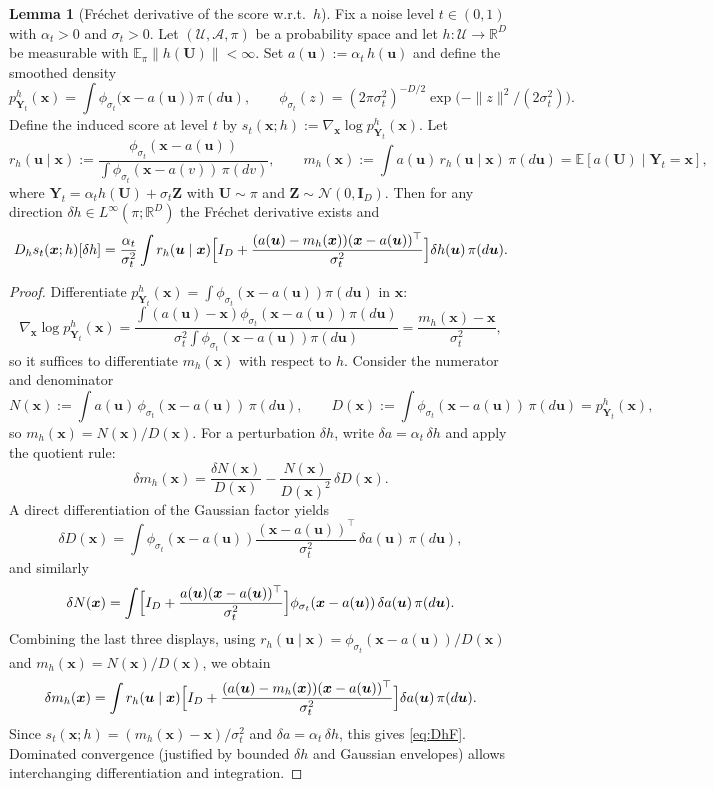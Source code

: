 \documentclass[12pt]{article}
\theoremstyle{definition} %
\newtheorem{lemma}{Lemma}
\newcommand{\R}{\mathbb{R}}
\providecommand{\E}{\mathbb{E}}
\begin{document}
\begin{lemma}[Fr\'echet derivative of the score w.r.t.\ $h$]\label{lem:DhF}
Fix a noise level $t\in(0,1)$ with $\alpha_t>0$ and $\sigma_t>0$.
Let $(\mathcal U,\mathcal A,\pi)$ be a probability space
and let $h:\mathcal U\to\mathbb R^D$ be measurable with $\E_\pi\|h(\bm U)\|<\infty$.
Set $a(\bm u):=\alpha_t\,h(\bm u)$ and define the smoothed density
\[
p_{\bm Y_t}^h(\bm x)=\int \phi_{\sigma_t}\!\bigl(\bm x-a(\bm u)\bigr)\,\pi(d\bm u),\qquad
\phi_{\sigma_t}(z)=(2\pi\sigma_t^2)^{-D/2}\exp\!\bigl(-\|z\|^2/(2\sigma_t^2)\bigr).
\]
Define the induced score at level $t$ by
$s_t(\bm x;h):=\nabla_{\bm x}\log p_{\bm Y_t}^h(\bm x)$.
Let
\[
r_h(\bm u\mid \bm x):=\frac{\phi_{\sigma_t}(\bm x-a(\bm u))}{\int \phi_{\sigma_t}(\bm x-a(v))\,\pi(d v)},\qquad
m_h(\bm x):=\int a(\bm u)\,r_h(\bm u\mid \bm x)\,\pi(d\bm u)=\E[a(\bm U)\mid \bm Y_t=\bm x],
\]
where $\bm Y_t=\alpha_t h(\bm U)+\sigma_t \bm Z$ with $\bm U\sim\pi$ and $\bm Z\sim\mathcal N(0,\bm{I}_D)$.
Then for any direction $\delta h\in L^\infty(\pi;\R^D)$ the Fr\'echet derivative exists and
\begin{equation}\label{eq:DhF}
D_h s_t(\bm x;h)[\delta h]
=\frac{\alpha_t}{\sigma_t^2}\int r_h(\bm u\mid \bm x)\Bigl[I_D+\frac{(a(\bm u)-m_h(\bm x))(\bm x-a(\bm u))^\top}{\sigma_t^2}\Bigr]\delta h(\bm u)\,\pi(d\bm u).
\end{equation}
\end{lemma}
\begin{proof}
Differentiate $p_{\bm Y_t}^h(\bm x)=\int \phi_{\sigma_t}(\bm x-a(\bm u))\pi(d\bm u)$ in $\bm x$:
\[
\nabla_{\bm x}\log p_{\bm Y_t}^h(\bm x)
=\frac{\int (a(\bm u)-\bm x)\phi_{\sigma_t}(\bm x-a(\bm u))\pi(d\bm u)}{\sigma_t^2\int \phi_{\sigma_t}(\bm x-a(\bm u))\pi(d\bm u)}
=\frac{m_h(\bm x)-\bm x}{\sigma_t^2},
\]
so it suffices to differentiate $m_h(\bm x)$ with respect to $h$.
Consider the numerator and denominator
\[
N(\bm x):=\int a(\bm u)\,\phi_{\sigma_t}(\bm x-a(\bm u))\,\pi(d\bm u),\qquad
D(\bm x):=\int \phi_{\sigma_t}(\bm x-a(\bm u))\,\pi(d\bm u)=p_{\bm Y_t}^h(\bm x),
\]
so $m_h(\bm x)=N(\bm x)/D(\bm x)$.
For a perturbation $\delta h$, write $\delta a=\alpha_t\,\delta h$ and apply the quotient rule:
\[
\delta m_h(\bm x)=\frac{\delta N(\bm x)}{D(\bm x)}-\frac{N(\bm x)}{D(\bm x)^2}\,\delta D(\bm x).
\]
A direct differentiation of the Gaussian factor yields
\[
\delta D(\bm x)=\int \phi_{\sigma_t}(\bm x-a(\bm u))\frac{(\bm x-a(\bm u))^\top}{\sigma_t^2}\,\delta a(\bm u)\,\pi(d\bm u),
\]
and similarly
\[
\delta N(\bm x)=\int \Bigl[I_D+\frac{a(\bm u)(\bm x-a(\bm u))^\top}{\sigma_t^2}\Bigr]\phi_{\sigma_t}(\bm x-a(\bm u))\,\delta a(\bm u)\,\pi(d\bm u).
\]
Combining the last three displays, using $r_h(\bm u\mid \bm x)=\phi_{\sigma_t}(\bm x-a(\bm u))/D(\bm x)$ and $m_h(\bm x)=N(\bm x)/D(\bm x)$, we obtain
\[
\delta m_h(\bm x)
=\int r_h(\bm u\mid \bm x)\Bigl[I_D+\frac{(a(\bm u)-m_h(\bm x))(\bm x-a(\bm u))^\top}{\sigma_t^2}\Bigr]\delta a(\bm u)\,\pi(d\bm u).
\]
Since $s_t(\bm x;h)=(m_h(\bm x)-\bm x)/\sigma_t^2$ and $\delta a=\alpha_t\,\delta h$, this gives \eqref{eq:DhF}.
Dominated convergence (justified by bounded $\delta h$ and Gaussian envelopes) allows interchanging differentiation and integration.
\end{proof}
\end{document}

